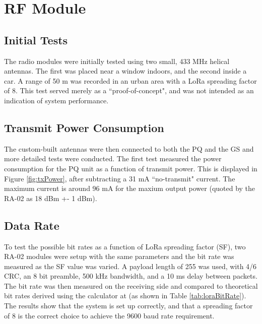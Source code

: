 \graphicspath{{./figures}}

\section{RF Module}

\subsection{Initial Tests}
The radio modules were initially tested using two small, 433 MHz helical antennas. The first was placed near a window indoors, and the second inside a car. A range of 50 m was recorded in an urban area with a LoRa spreading factor of 8. This test served merely as a ``proof-of-concept", and was not intended as an indication of system performance.

\subsection{Transmit Power Consumption}
The custom-built antennas were then connected to both the PQ and the GS and more detailed tests were conducted. The first test measured the power consumption for the PQ unit as a function of transmit power. This is displayed in Figure \ref{fig:txPower}, after subtracting a 31 mA ``no-transmit" current. The maximum current is around 96 mA for the maxium output power (quoted by the RA-02 as 18 dBm +- 1 dBm).

\subsection{Data Rate}
To test the possible bit rates as a function of LoRa spreading factor (SF), two RA-02 modules were setup with the same parameters and the bit rate was measured as the SF value was varied. A payload length of 255 was used, with 4/6 CRC, an 8 bit preamble, 500 kHz bandwidth, and a 10 ms delay between packets. The bit rate was then measured on the receiving side and compared to theoretical bit rates derived using the calculator at \cite{site-loraBitRateCalculator} (as shown in Table \ref{tab:loraBitRate}). The results show that the system is set up correctly, and that a spreading factor of 8 is the correct choice to achieve the 9600 baud rate requirement.

